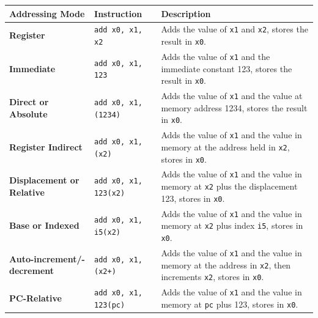 \begin{center}
\begin{tabular}{|l|l|l|}
\hline
\textbf{Addressing Mode}          & \textbf{Instruction}                                      & \textbf{Description}                                                                                   \\ \hline
\textbf{Register}                 & \texttt{add x0, x1, x2}                                   & Adds the value of \texttt{x1} and \texttt{x2}, stores the result in \texttt{x0}.                         \\ \hline
\textbf{Immediate}                & \texttt{add x0, x1, 123}                                  & Adds the value of \texttt{x1} and the immediate constant 123, stores the result in \texttt{x0}.          \\ \hline
\textbf{Direct or Absolute}       & \texttt{add x0, x1, (1234)}                               & Adds the value of \texttt{x1} and the value at memory address 1234, stores the result in \texttt{x0}.    \\ \hline
\textbf{Register Indirect}        & \texttt{add x0, x1, (x2)}                                 & Adds the value of \texttt{x1} and the value in memory at the address held in \texttt{x2}, stores in \texttt{x0}. \\ \hline
\textbf{Displacement or Relative} & \texttt{add x0, x1, 123(x2)}                              & Adds the value of \texttt{x1} and the value in memory at \texttt{x2} plus the displacement 123, stores in \texttt{x0}. \\ \hline
\textbf{Base or Indexed}          & \texttt{add x0, x1, i5(x2)}                               & Adds the value of \texttt{x1} and the value in memory at \texttt{x2} plus index \texttt{i5}, stores in \texttt{x0}. \\ \hline
\textbf{Auto-increment/-decrement} & \texttt{add x0, x1, (x2+)}                               & Adds the value of \texttt{x1} and the value in memory at the address in \texttt{x2}, then increments \texttt{x2}, stores in \texttt{x0}. \\ \hline
\textbf{PC-Relative}              & \texttt{add x0, x1, 123(pc)}                              & Adds the value of \texttt{x1} and the value in memory at \texttt{pc} plus 123, stores in \texttt{x0}.    \\ \hline
\end{tabular}
\end{center}
    
